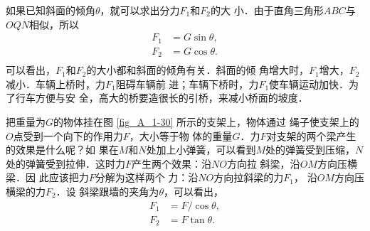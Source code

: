     如果已知斜面的倾角$\theta$，就可以求出分力$F_1$和$F_2$的大
小．由于直角三角形$ABC$与$OQN$相似，所以
\[\begin{split} 
F_1&= G\sin\theta, \\
F_2&= G\cos\theta. \\
\end{split}  \]
可以看出，$F_1$和$F_2$的大小都和斜面的倾角有关．斜面的倾
角增大时，$F_1$增大，$F_2$减小．车辆上桥时，力$F_1$阻碍车辆前
进；车辆下桥时，力$F_1$使车辆运动加快．为了行车方便与安
全，高大的桥要造很长的引桥，来减小桥面的坡度．

    把重量为$G$的物体挂在图 \ref{fig_A_1-30} 所示的支架上，物体通过
绳子使支架上的$O$点受到一个向下的作用力$F$，大小等于物
体的重量$G$．力$F$对支架的两个梁产生的效果是什么呢？如
果在$M$和$N$处加上小弹簧，可以看到$M$处的弹簧受到压缩，$N$
处的弹簧受到拉伸．这时力$F$产生两个效果：沿$NO$方向拉
斜梁，沿$OM$方向压横梁．因
此应该把力$F$分解为这样两个
力：沿$NO$方向拉斜梁的力$F_1$，
沿$OM$方向压横梁的力$F_2$．设
斜梁跟墙的夹角为$\theta$，可以看出，
\[\begin{split} 
F_1&= F/\cos\theta, \\
F_2&= F\tan\theta. \\
\end{split}  \]

